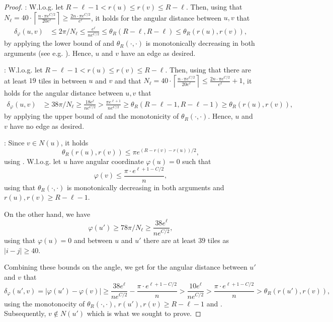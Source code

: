 \documentclass[letterpaper,11pt]{article}
\newcommand{\1}{\mathbb I}
\newcommand{\angulardist}[2]{\delta_\varphi(#1,#2)}
\begin{document}
%
\begin{proof}
: W.l.o.g. let $R - \ell - 1 < r(u) \leq r(v) \leq R - \ell$. Then, using that $N_\ell = 40\cdot \left\lceil \frac{n \cdot \pi e^{C/2}}{20e^{\ell}}\right\rceil  \geq \frac{2 n \cdot \pi e^{C/2}}{e^{\ell}}$, it holds for the angular distance between $u, v$ that
%
\begin{align*}
    \angulardist{u}{v} &\leq 2\pi/ N_\ell
    \leq \frac{e^{\ell}}{ne^{C/2}} 
    \leq \theta_R(R- \ell, R - \ell)
    \leq \theta_R(r(u), r(v)),
\end{align*}
%
by applying the lower bound of  and  $\theta_R(\cdot, \cdot)$ is monotonically decreasing in both arguments (see e.g. \cite[Remark 4]{km-slcrhg-19}). Hence, $u$ and $v$ have an edge as desired.

\smallskip

: W.l.o.g. let $R - \ell - 1 < r(u) \leq r(v) \leq R - \ell$. Then, using that there are at least $19$ tiles in between $u$ and $v$ and that $N_\ell = 40\cdot \left\lceil \frac{n \cdot \pi e^{C/2}}{20e^{\ell}}\right\rceil  \leq \frac{2 n \cdot \pi e^{C/2}}{e^{\ell}} + 1$, it holds for the angular distance between $u, v$ that
%
\begin{align*}
    \angulardist{u}{v} &\geq 38\pi/ N_\ell
    \geq \frac{18 e^{\ell}}{ne^{C/2}}
    > \frac{\pi e^{\ell+1}}{ne^{C/2}}
    \geq \theta_R(R- \ell - 1, R - \ell - 1)
    \geq \theta_R(r(u), r(v)),
\end{align*}
%
by applying the upper bound of  and the monotonicity of $\theta_R(\cdot, \cdot)$. Hence, $u$ and $v$ have no edge as desired.

\smallskip

:
Since $v \in N(u)$, it holds 
%
$$
\theta_R(r(u), r(v)) \leq \pi e^{(R-r(v) -r(u))/2},
$$
%
using . W.l.o.g. let $u$ have angular coordinate $\varphi(u) = 0$ such that 
%
$$\varphi(v) \leq \frac{\pi \cdot e^{\ell+1-C/2}}{n}, $$
%
using that $\theta_R(\cdot, \cdot)$ is monotonically decreasing in both arguments and $r(u), r(v) \geq R - \ell - 1$. 

On the other hand, we have 
%
$$\varphi(u') \geq 78\pi/ N_\ell \geq \frac{38 e^{\ell}}{ne^{C/2}} ,$$
%
using that $\varphi(u) = 0$ and between $u$ and $u'$ there are at least $39$ tiles as $|i-j|\geq 40$.

Combining these bounds on the angle, we get for the angular distance between $u'$ and $v$ that
%
$$
\angulardist{u'}{v} = |\varphi(u') - \varphi(v)| \geq \frac{38 e^{\ell}}{ne^{C/2}} - \frac{\pi \cdot e^{\ell+1-C/2}}{n} > \frac{10 e^{\ell}}{ne^{C/2}} > \frac{\pi \cdot e^{\ell+1-C/2}}{n} > \theta_R(r(u'), r(v)),
$$
%
using the monotonocity of $\theta_R(\cdot, \cdot)$, $r(u'), r(v) \geq R - \ell - 1$ and . Subsequently, $v \not\in N(u')$ which is what we sought to prove. 
\end{proof}
%
\end{document}
